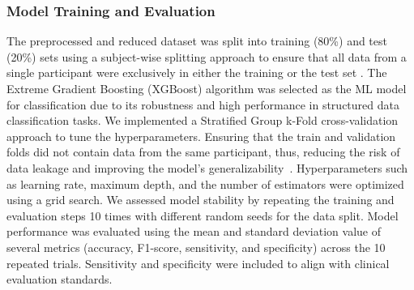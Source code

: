 \documentclass[sensors,article,submit,pdftex,moreauthors]{Definitions/mdpi}
\begin{document}
\subsubsection{Model Training and Evaluation}
The preprocessed and reduced dataset was split into training (80\%) and test (20\%) sets using a subject-wise splitting approach to ensure that all data from a single participant were exclusively in either the training or the test set \cite{Saeb2017}. The Extreme Gradient Boosting (XGBoost) algorithm \cite{chen2016xgboost} was selected as the ML model for classification due to its robustness and high performance in structured data classification tasks. We implemented a Stratified Group k-Fold cross-validation approach to tune the hyperparameters. Ensuring that the train and validation folds did not contain data from the same participant, thus, reducing the risk of data leakage and improving the model's generalizability\textcolor{revision2}{~\cite{kapoor2023leakage}}. Hyperparameters such as learning rate, maximum depth, and the number of estimators were optimized using a grid search.
We assessed model stability by repeating the training and evaluation steps 10 times with different random seeds for the data split. Model performance was evaluated using the mean and standard deviation value of several metrics (accuracy, F1-score, sensitivity, and specificity) across the 10 repeated trials. Sensitivity and specificity were included to align with clinical evaluation standards.
\end{document}
